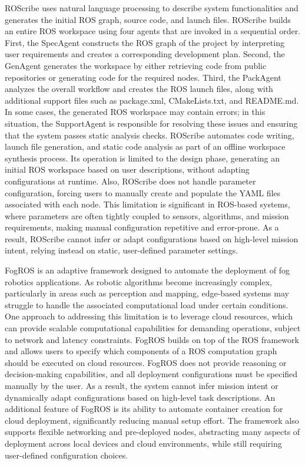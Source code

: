 ROScribe \cite{roscribe} uses natural language processing to describe system functionalities and generates the initial ROS graph, 
source code, and launch files. ROScribe builds an entire ROS workspace using four agents that are invoked in a sequential order.
First, the SpecAgent constructs the ROS graph of the project by interpreting user requirements and creates a corresponding
development plan. Second, the GenAgent generates the workspace by either retrieving code from public repositories or 
generating code for the required nodes. Third, the PackAgent analyzes the overall workflow and creates the ROS launch 
files, along with additional support files such as package.xml, CMakeLists.txt, and README.md. In some cases, the generated
ROS workspace may contain errors; in this situation, the SupportAgent is responsible for resolving these issues and ensuring
that the system passes static analysis checks. ROScribe automates code writing, launch file generation, and static code analysis
as part of an offline workspace synthesis process. Its operation is limited to the design phase, generating an initial ROS 
workspace based on user descriptions, without adapting configurations at runtime. Also, ROScribe does not handle
parameter configuration, forcing users to manually create and populate the YAML files associated with each node. This 
limitation is significant in ROS-based systems, where parameters are often tightly coupled to sensors, algorithms, and 
mission requirements, making manual configuration repetitive and error-prone. As a result, ROScribe cannot infer or adapt
configurations based on high-level mission intent, relying instead on static, user-defined parameter settings.

FogROS \cite{fogros22023} is an adaptive framework designed to automate the deployment of fog robotics applications. As robotic algorithms become
increasingly complex, particularly in areas such as perception and mapping, edge-based systems may struggle to handle the 
associated computational load under certain conditions. One approach to addressing this limitation is to leverage cloud 
resources, which can provide scalable computational capabilities for demanding operations, subject to network and latency
constraints. FogROS builds on top of the ROS framework and allows users to specify which components of a ROS computation
graph should be executed on cloud resources. FogROS does not provide reasoning or decision-making capabilities, and all 
deployment configurations must be specified manually by the user. As a result, the system cannot infer mission intent or
dynamically adapt configurations based on high-level task descriptions. An additional feature of FogROS is its ability to
automate container creation for cloud deployment, significantly reducing manual setup effort. The framework also supports
flexible networking and pre-deployed nodes, abstracting many aspects of deployment across local devices and cloud environments,
while still requiring user-defined configuration choices.

